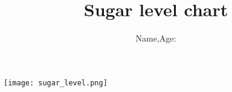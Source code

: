 \documentclass[11pt]{article}
\title{Sugar level chart}
\author{Name,Age:}
\begin{document}
\maketitle



\texttt{[image: sugar\_level.png]}
\end{document}
